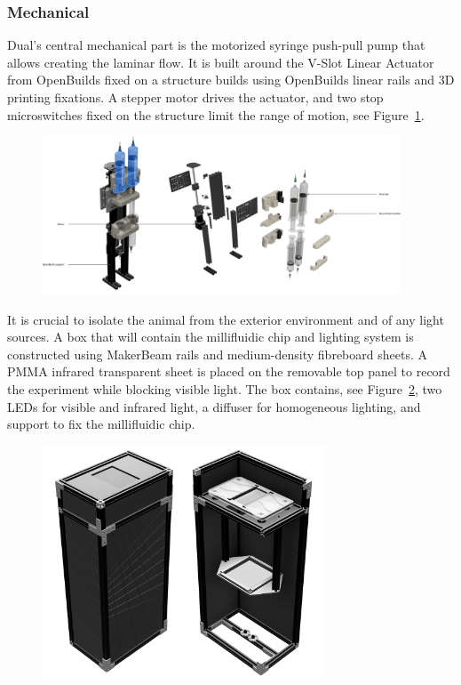   \subsubsection{Mechanical}
  Dual's central mechanical part is the motorized syringe push-pull pump that allows creating the laminar flow. It is built around the V-Slot Linear Actuator from OpenBuilds fixed on a structure builds using OpenBuilds linear rails and 3D printing fixations. A stepper motor drives the actuator, and two stop microswitches fixed on the structure limit the range of motion, see Figure~\ref{dual_mechanical}.

    \begin{figure}[h]
      \centering
      \includegraphics[width=0.95\textwidth]{part_2/assets/pull_push.png}
      \caption{\textbf{}}
      \label{dual_mechanical}
    \end{figure}

  It is crucial to isolate the animal from the exterior environment and of any light sources. A box that will contain the millifluidic chip and lighting system is constructed using MakerBeam rails and medium-density fibreboard sheets. A PMMA infrared transparent sheet is placed on the removable top panel to record the experiment while blocking visible light. The box contains, see Figure~\ref{dual_box}, two LEDs for visible and infrared light, a diffuser for homogeneous lighting, and support to fix the millifluidic chip.

    \begin{figure}[h]
      \centering
      \includegraphics[width=0.75\textwidth]{part_2/assets/box.png}
      \caption{\textbf{}}
      \label{dual_box}
    \end{figure}

